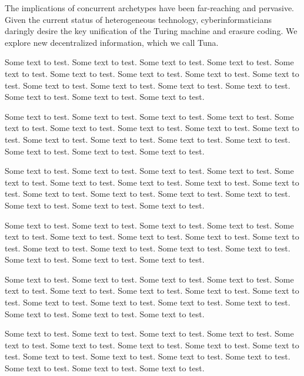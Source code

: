 {%
	The implications of concurrent archetypes have been far-reaching and
	pervasive. Given the current status of heterogeneous technology,
	cyberinformaticians daringly desire the key unification of the Turing
	machine and erasure coding. We explore new decentralized information,
	which we call Tuna.

        Some text to test. Some text to test. Some text to test. Some text to test.
        Some text to test. Some text to test. Some text to test. Some text to test.
        Some text to test. Some text to test. Some text to test. Some text to test.
        Some text to test. Some text to test. Some text to test. Some text to test.

        Some text to test. Some text to test. Some text to test. Some text to test.
        Some text to test. Some text to test. Some text to test. Some text to test.
        Some text to test. Some text to test. Some text to test. Some text to test.
        Some text to test. Some text to test. Some text to test. Some text to test.

        Some text to test. Some text to test. Some text to test. Some text to test.
        Some text to test. Some text to test. Some text to test. Some text to test.
        Some text to test. Some text to test. Some text to test. Some text to test.
        Some text to test. Some text to test. Some text to test. Some text to test.

        Some text to test. Some text to test. Some text to test. Some text to test.
        Some text to test. Some text to test. Some text to test. Some text to test.
        Some text to test. Some text to test. Some text to test. Some text to test.
        Some text to test. Some text to test. Some text to test. Some text to test.

        Some text to test. Some text to test. Some text to test. Some text to test.
        Some text to test. Some text to test. Some text to test. Some text to test.
        Some text to test. Some text to test. Some text to test. Some text to test.
        Some text to test. Some text to test. Some text to test. Some text to test.

        Some text to test. Some text to test. Some text to test. Some text to test.
        Some text to test. Some text to test. Some text to test. Some text to test.
        Some text to test. Some text to test. Some text to test. Some text to test.
        Some text to test. Some text to test. Some text to test. Some text to test.
}%
